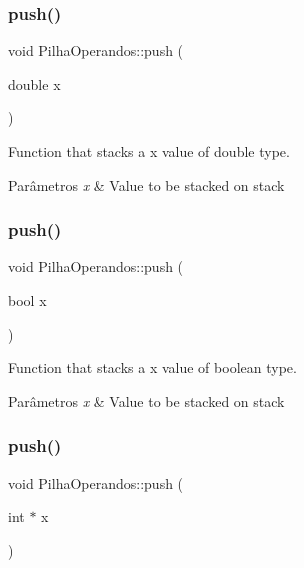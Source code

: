 \subsubsection{\texorpdfstring{push()}{push()}\hspace{0.1cm}{\footnotesize\ttfamily [3/7]}}
{\footnotesize\ttfamily void Pilha\+Operandos\+::push (\begin{DoxyParamCaption}\item[{double}]{x }\end{DoxyParamCaption})}



Function that stacks a x value of double type. 


\begin{DoxyParams}{Parâmetros}
{\em x} & Value to be stacked on stack \\
\hline
\end{DoxyParams}
\mbox{\label{classPilhaOperandos_a76e6e4b9d47f9e549e4a9d76aef6d89d}} 
\subsubsection{\texorpdfstring{push()}{push()}\hspace{0.1cm}{\footnotesize\ttfamily [4/7]}}
{\footnotesize\ttfamily void Pilha\+Operandos\+::push (\begin{DoxyParamCaption}\item[{bool}]{x }\end{DoxyParamCaption})}



Function that stacks a x value of boolean type. 


\begin{DoxyParams}{Parâmetros}
{\em x} & Value to be stacked on stack \\
\hline
\end{DoxyParams}
\mbox{\label{classPilhaOperandos_aef0bd19eae8107546d419aba6d7c2d47}} 
\subsubsection{\texorpdfstring{push()}{push()}\hspace{0.1cm}{\footnotesize\ttfamily [5/7]}}
{\footnotesize\ttfamily void Pilha\+Operandos\+::push (\begin{DoxyParamCaption}\item[{int $\ast$}]{x }\end{DoxyParamCaption})}



